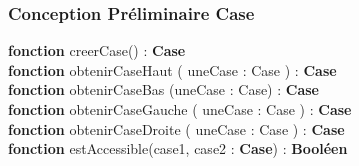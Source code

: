 \subsubsection{Conception Préliminaire Case}

\begin{algorithm}
\textbf{fonction} creerCase() : \textbf{Case} \\
\textbf{fonction} obtenirCaseHaut ( uneCase : Case ) : \textbf{Case} \\
\textbf{fonction} obtenirCaseBas (uneCase : Case) : \textbf{Case}\\
\textbf{fonction} obtenirCaseGauche ( uneCase : Case ) : \textbf{Case}\\
\textbf{fonction} obtenirCaseDroite ( uneCase : Case ) : \textbf{Case}\\
\textbf{fonction} estAccessible(case1, case2 : \textbf{Case}) : \textbf{Booléen} 
\end{algorithm}





